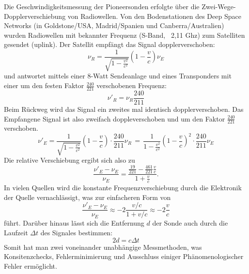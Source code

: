 \documentclass[a4paper,10pt]{article}
\begin{document}
Die Geschwindigkeitsmessung der Pioneersonden erfolgte über die Zwei-Wege-Dopplerverschiebung von Radiowellen.
Von den Bodenstationen des Deep Space Networks (in Goldstone/USA, Madrid/Spanien und Canberra/Australien) wurden
Radiowellen mit bekannter Frequenz (S-Band, ~2,11 Ghz) zum Satelliten gesendet (uplink).
Der Satellit empfängt das Signal dopplerverschoben:
\begin{equation}
 \nu_R = \frac{1}{\sqrt{1-\frac{v^2}{c^2}}}(1-\frac{v}{c})\nu_E
\end{equation}
und antwortet mittels einer 8-Watt Sendeanlage und eines Transponders
mit einer um den festen Faktor $ \frac{240}{221} $ verschobenen Frequenz:
\begin{equation}
\nu'_R = \nu_R\frac{240}{211}
\end{equation}
Beim Rückweg wird das Signal ein zweites mal identisch dopplerverschoben.
Das Empfangene Signal ist also zweifach doppleverschoben und um den Faktor $\frac{240}{221}$ verschoben.
\begin{equation}
 \nu'_E = \frac{1}{\sqrt{1-\frac{v^2}{c^2}}}(1-\frac{v}{c}) \cdot \frac{240}{211}\nu_R \, = \, \frac{1}{1-\frac{v^2}{c^2}}(1-\frac{v}{c})^2 \cdot \frac{240}{211} \nu_E
\end{equation}
Die relative Verschiebung ergibt sich also zu
\begin{equation}
 \frac{\nu'_E-\nu_E}{\nu_E} = \frac{\frac{19}{221}- \frac{461}{221}\frac{v}{c}}{1+\frac{v}{c}}.
\end{equation}
In vielen Quellen wird die konstante Frequenzverschiebung durch die Elektronik der Quelle vernachlässigt, was zur einfacheren Form von
\begin{equation}
 \frac{\nu'_E-\nu_E}{\nu_E} \approx -2\frac{v/c}{1+v/c} \approx -2 \frac{v}{c}
\end{equation}
führt.
Darüber hinaus lässt sich die Entfernung $d$ der Sonde auch durch die Laufzeit $\Delta t$ des Signales bestimmen:
\begin{equation}
 2d = c \Delta t
\end{equation}
Somit hat man zwei voneinander unabhängige Messmethoden, was Konsitenzchecks,
Fehlerminimierung und Ausschluss einiger Phänomenologischer Fehler ermöglicht.
\end{document}
